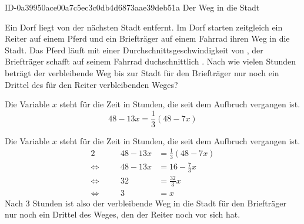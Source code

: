 \begin{exercise}
      {ID-0a39950ace00a7c5ec3c0db4d6873aae39deb51a}
      {Der Weg in die Stadt}
  \ifproblem\problem\par
    Ein Dorf liegt  von der nächsten Stadt entfernt. Im Dorf starten zeitgleich
    ein Reiter auf einem Pferd und ein Briefträger auf einem Fahrrad ihren Weg in die Stadt.
    Das Pferd läuft mit einer Durchschnittsgeschwindigkeit von , der Briefträger
    schafft auf seinem Fahrrad duchschnittlich . Nach wie vielen Stunden beträgt
    der verbleibende Weg bis zur Stadt für den Briefträger nur noch ein Drittel des für
    den Reiter verbleibenden Weges?
  \fi
  \ifoutline\outline\par
    Die Variable $x$ steht für die Zeit in Stunden, die seit dem Aufbruch
    vergangen ist.
    \begin{equation*}
      48-13x=\frac{1}{3}(48-7x)
    \end{equation*}
  \fi
  \ifoutcome\outcome\par
    Die Variable $x$ steht für die Zeit in Stunden, die seit dem Aufbruch
    vergangen ist.
    \newcommand{\aq}{\Leftrightarrow}%
    \begin{alignat*}{2}
         &\quad & 48-13x&=\frac{1}{3}(48-7x) \\
      \aq&\quad & 48-13x&=16-\frac{7}{3}x \\
      \aq&\quad &     32&=\frac{32}{3}x \\
      \aq&\quad &      3&=x
    \end{alignat*}
    Nach 3 Stunden ist also der verbleibende Weg in die Stadt für den Briefträger
    nur noch ein Drittel des Weges, den der Reiter noch vor sich hat.
  \fi
\end{exercise}

